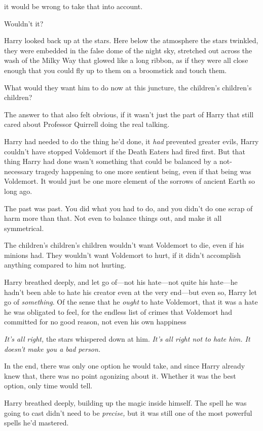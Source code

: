{\el} it would be wrong to take that into account.

Wouldn't it?

Harry looked back up at the stars. Here below the atmosphere the stars
twinkled, they were embedded in the false dome of the night sky, stretched out
across the wash of the Milky Way that glowed like a long ribbon, as if they
were all close enough that you could fly up to them on a broomstick and touch
them.

What would they want him to do now at this juncture, the children's children's
children?

The answer to that also felt obvious, if it wasn't just the part of Harry that
still cared about Professor Quirrell doing the real talking.

Harry had needed to do the thing he'd done, it \emph{had} prevented greater
evils, Harry couldn't have stopped Voldemort if the Death Eaters had fired
first. But that thing Harry had done wasn't something that could be balanced by
a not-necessary tragedy happening to one more sentient being, even if that
being was Voldemort. It would just be one more element of the sorrows of
ancient Earth so long ago.

The past was past. You did what you had to do, and you didn't do one scrap of
harm more than that. Not even to balance things out, and make it all
symmetrical.

The children's children's children wouldn't want Voldemort to die, even if his
minions had. They wouldn't want Voldemort to hurt, if it didn't accomplish
anything compared to him not hurting.

Harry breathed deeply, and let go of---not his hate---not quite his hate---he
hadn't been able to hate his creator even at the very end---but even so, Harry
let go of \emph{something}. Of the sense that he \emph{ought} to hate
Voldemort, that it was a hate he was obligated to feel, for the endless list of
crimes that Voldemort had committed for no good reason, not even his own
happiness{\el}

\emph{It's all right,} the stars whispered down at him. \emph{It's all right
not to hate him. It doesn't make you a bad person.}

In the end, there was only one option he would take, and since Harry already
knew that, there was no point agonizing about it. Whether it was the best
option, only time would tell.

Harry breathed deeply, building up the magic inside himself. The spell he was
going to cast didn't need to be \emph{precise,} but it was still one of the
most powerful spells he'd mastered.

